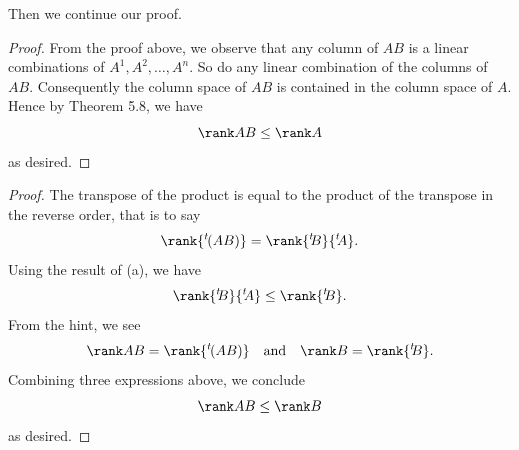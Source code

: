 {{\begin{solution}
{            Then we continue our proof. 
            \begin{proof}
                From the proof above, we observe that any column of $AB$ is a linear combinations of $A^1, A^2, \dots, A^n$. 
                So do any linear combination of the columns of $AB$. 
                Consequently the column space of $AB$ is contained in the column space of $A$. 
                Hence by Theorem 5.8, we have 
                \begin{equation*}
                    \rank AB \leq \rank A 
                \end{equation*}
                as desired. 
            \end{proof}
            \item
            \begin{proof}
                The transpose of the product is equal to the product of the transpose in the reverse order, that is to say 
                \begin{equation*}
                    \rank {^{t\!}(AB)} = \rank {^{t\!\!}B} {^{t\!\!}A}. 
                \end{equation*}
                Using the result of (a), we have
                \begin{equation*}
                    \rank {^{t\!\!}B} {^{t\!\!}A} \leq \rank {^{t\!\!}B}. 
                \end{equation*}
                From the hint, we see
                \begin{equation*}
                    \rank AB = \rank {^{t\!}(AB)} \quad \text{and} \quad \rank B = \rank {^{t\!\!}B}. 
                \end{equation*}
                Combining three expressions above, we conclude
                \begin{equation*}
                    \rank AB \leq \rank B 
                \end{equation*}
                as desired.
            \end{proof}

        }
    \end{solution}
}}
